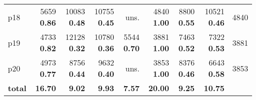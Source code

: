 \begin{tabular}{|l|rrrrrrr|r|}
p18 & {\footnotesize 5659} \textbf{0.86} & {\footnotesize 10083} \textbf{0.48} & {\footnotesize 10755} \textbf{0.45} & uns. & {\footnotesize 4840} \textbf{1.00} & {\footnotesize 8800} \textbf{0.55} & {\footnotesize 10521} \textbf{0.46} & 4840\\
p19 & {\footnotesize 4733} \textbf{0.82} & {\footnotesize 12128} \textbf{0.32} & {\footnotesize 10780} \textbf{0.36} & {\footnotesize 5544} \textbf{0.70} & {\footnotesize 3881} \textbf{1.00} & {\footnotesize 7463} \textbf{0.52} & {\footnotesize 7322} \textbf{0.53} & 3881\\
p20 & {\footnotesize 4973} \textbf{0.77} & {\footnotesize 8756} \textbf{0.44} & {\footnotesize 9632} \textbf{0.40} & uns. & {\footnotesize 3853} \textbf{1.00} & {\footnotesize 8376} \textbf{0.46} & {\footnotesize 6643} \textbf{0.58} & 3853\\
\hline
\textbf{total} & \textbf{16.70} & \textbf{9.02} & \textbf{9.93} & \textbf{7.57} & \textbf{20.00} & \textbf{9.25} & \textbf{10.75} & \\
\hline
\end{tabular}


